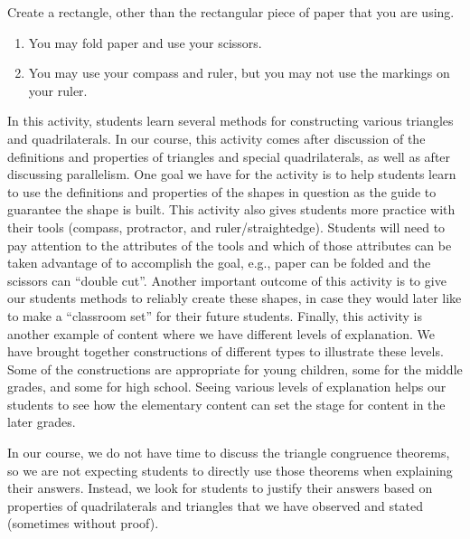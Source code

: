 \documentclass[nooutcomes]{ximera}
\begin{document}
\begin{problem}
Create a rectangle, other than the rectangular piece of paper that you are using.
\begin{enumerate}
\item You may fold paper and use your scissors.
\item You may use your compass and ruler, but you may not use the markings on your ruler.
\end{enumerate}
\end{problem}

\newpage
\begin{instructorNotes}
In this activity, students learn several methods for constructing various triangles and quadrilaterals.  In our course, this activity comes after discussion of the definitions and properties of triangles and special quadrilaterals, as well as after discussing parallelism.  One goal we have for the activity is to help students learn to use the definitions and properties of the shapes in question as the guide to guarantee the shape is built.  This activity also gives students more practice with their tools (compass, protractor, and ruler/straightedge).  Students will need to pay attention to the attributes of the tools and which of those attributes can be taken advantage of to accomplish the goal, e.g., paper can be folded and the scissors can “double cut”.  Another important outcome of this activity is to give our students methods to reliably create these shapes, in case they would later like to make a ``classroom set'' for their future students.  Finally, this activity is another example of content where we have different levels of explanation.  We have brought together constructions of different types to illustrate these levels.  Some of the constructions are appropriate for young children, some for the middle grades, and some for high school.  Seeing various levels of explanation helps our students to see how the elementary content can set the stage for content in the later grades.



In our course, we do not have time to discuss the triangle congruence theorems, so we are not expecting students to directly use those theorems when explaining their answers.  Instead, we look for students to justify their answers based on properties of quadrilaterals and triangles that we have observed and stated (sometimes without proof).

    
    
\end{instructorNotes}
\end{document}
